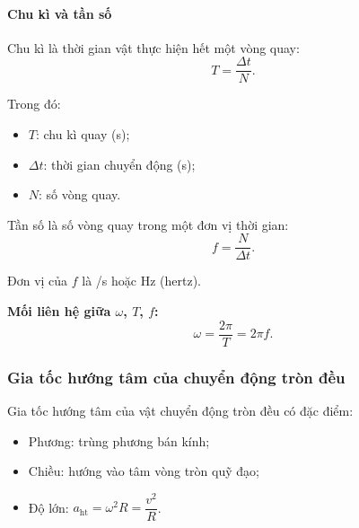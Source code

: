 \begin{tomtat}
	\paragraph{Chu kì và tần số}
	\begin{dn}
		Chu kì là thời gian vật thực hiện hết một vòng quay:
		$$T=\dfrac{\Delta t}{N}.$$
	\end{dn}
	Trong đó:
	\begin{itemize}
		\item $	T$: chu kì quay (\si{\second});
		\item $\Delta t$: thời gian chuyển động (\si{\second});
		\item $N$: số vòng quay.
	\end{itemize}
	\begin{dn}
		Tần số là số vòng quay trong một đơn vị thời gian:
		$$f=\dfrac{N}{\Delta t}.$$
		
	\end{dn}
	Đơn vị của $f$ là \si{/\second} hoặc $\si{\hertz}$ (hertz).
	\begin{boxdn}
		\textbf{Mối liên hệ giữa $\omega$, $T$, $f$:}
		$$\omega=\dfrac{2\pi}{T}=2\pi f.$$
	\end{boxdn}
	\subsubsection{Gia tốc hướng tâm của chuyển động tròn đều}
	Gia tốc hướng tâm của vật chuyển động tròn đều có đặc điểm:
	\begin{itemize}
		\item Phương: trùng phương bán kính;
		\item Chiều: hướng vào tâm vòng tròn quỹ đạo;
		\item Độ lớn: $a_{\text{ht}}=\omega^2 R=\dfrac{v^2}{R}$.
	\end{itemize}
\end{tomtat}
